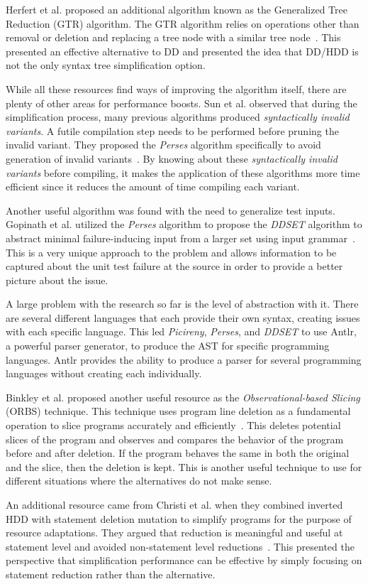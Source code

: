 Herfert et al. proposed an additional algorithm known as the Generalized Tree Reduction (GTR) algorithm. The GTR algorithm relies on operations other than removal or deletion and replacing a tree node with a similar tree node~\cite{Herfert2017GTR}. This presented an effective alternative to DD and presented the idea that DD/HDD is not the only syntax tree simplification option.

While all these resources find ways of improving the algorithm itself, there are plenty of other areas for performance boosts. Sun et al. observed that during the simplification process, many previous algorithms produced \emph{syntactically invalid variants}. A futile compilation step needs to be performed before pruning the invalid variant. They proposed the \emph{Perses} algorithm specifically to avoid generation of invalid variants~\cite{perses}. By knowing about these \emph{syntactically invalid variants} before compiling, it makes the application of these algorithms more time efficient since it reduces the amount of time compiling each variant.

Another useful algorithm was found with the need to generalize test inputs. Gopinath et al. utilized the \emph{Perses} algorithm to propose the \emph{DDSET} algorithm to abstract minimal failure-inducing input from a larger set using input grammar~\cite{gopinath2020abstracting}. This is a very unique approach to the problem and allows information to be captured about the unit test failure at the source in order to provide a better picture about the issue.

A large problem with the research so far is the level of abstraction with it. There are several different languages that each provide their own syntax, creating issues with each specific language. This led \emph{Picireny}, \emph{Perses}, and \emph{DDSET} to use Antlr, a powerful parser generator, to produce the AST for specific programming languages. Antlr provides the ability to produce a parser for several programming languages without creating each individually.

Binkley et al. proposed another useful resource as the \emph{Observational-based Slicing} (ORBS) technique. This technique uses program line deletion as a fundamental operation to slice programs accurately and efficiently~\cite{binkley2014orbs}. This deletes potential slices of the program and observes and compares the behavior of the program before and after deletion. If the program behaves the same in both the original and the slice, then the deletion is kept. This is another useful technique to use for different situations where the alternatives do not make sense.

An additional resource came from Christi et al. when they combined inverted HDD with statement deletion mutation to simplify programs for the purpose of resource adaptations. They argued that reduction is meaningful and useful at statement level and avoided non-statement level reductions~\cite{christi2017saso}. This presented the perspective that simplification performance can be effective by simply focusing on statement reduction rather than the alternative. 

